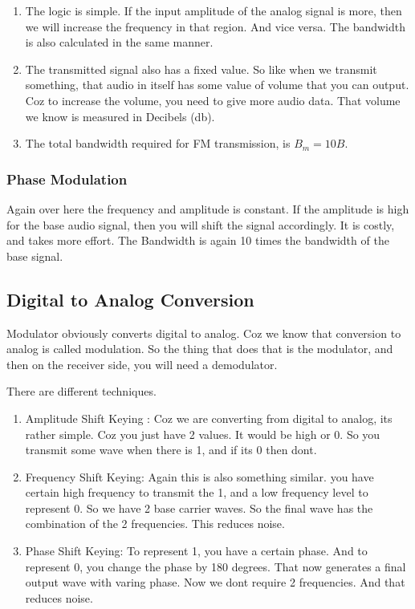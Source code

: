 \documentclass[11pt]{article}
\begin{document}
\begin{enumerate}
	\item The logic is simple. If the input amplitude of the analog signal is more, then we will increase the frequency in that region. And vice versa. The bandwidth is also calculated in the same manner. 
 \item The transmitted signal also has a fixed value. So like when we transmit something, that audio in itself has some value of volume that you can output. Coz to increase the volume, you need to give more audio data. That volume we know is measured in Decibels (db). 
 \item The total bandwidth required for FM transmission, is $B_m = 10B$.
\end{enumerate}


\subsubsection{Phase Modulation}
Again over here the frequency and amplitude is constant. If the amplitude is high for the base audio signal, then you will shift the signal accordingly. It is costly, and takes more effort. The Bandwidth is again 10 times the bandwidth of the base signal.

\subsection{Digital to Analog Conversion}
Modulator obviously converts digital to analog. Coz we know that conversion to analog is called modulation. So the thing that does that is the modulator, and then on the receiver side, you will need a demodulator.

There are different techniques.
\begin{enumerate}
	
	\item Amplitude Shift Keying : Coz we are converting from digital to analog, its rather simple. Coz you just have 2 values. It would be high or 0. So you transmit some wave when there is 1, and if its 0 then dont. 
	\item Frequency Shift Keying: Again this is also something similar. you have certain high frequency to transmit the 1, and a low frequency level to represent 0. So we have 2 base carrier waves. So the final wave has the combination of the 2 frequencies. This reduces noise.
	\item Phase Shift Keying: To represent 1, you have a certain phase. And to represent 0, you change the phase by 180 degrees. That now generates a final output wave with varing phase. Now we dont require 2 frequencies. And that reduces noise. 
\end{enumerate}
\end{document}
